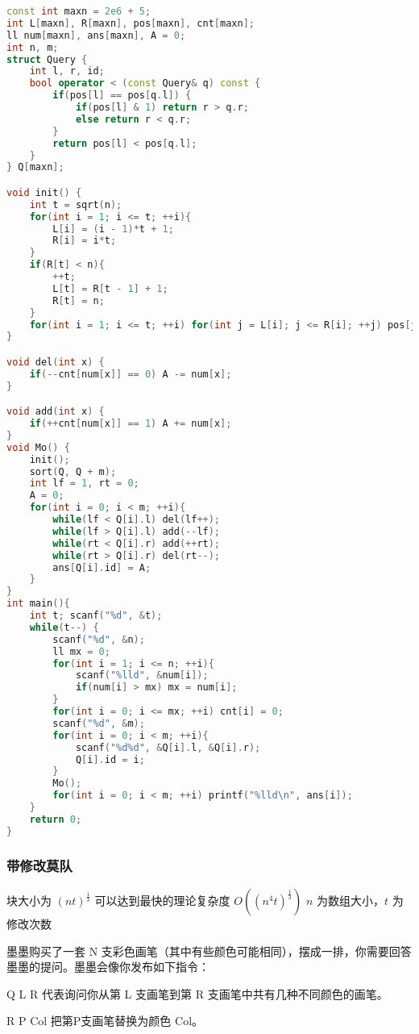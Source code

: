 \begin{lstlisting}[language=C++]
const int maxn = 2e6 + 5;
int L[maxn], R[maxn], pos[maxn], cnt[maxn];
ll num[maxn], ans[maxn], A = 0;
int n, m;
struct Query {
    int l, r, id;
    bool operator < (const Query& q) const {
        if(pos[l] == pos[q.l]) {
            if(pos[l] & 1) return r > q.r;
            else return r < q.r;
        }
        return pos[l] < pos[q.l];
    }
} Q[maxn];

void init() {
    int t = sqrt(n);
    for(int i = 1; i <= t; ++i){
        L[i] = (i - 1)*t + 1;
        R[i] = i*t;
    }
    if(R[t] < n){
        ++t;
        L[t] = R[t - 1] + 1;
        R[t] = n;
    }
    for(int i = 1; i <= t; ++i) for(int j = L[i]; j <= R[i]; ++j) pos[j] = i;
}

void del(int x) {
    if(--cnt[num[x]] == 0) A -= num[x];
}

void add(int x) {
    if(++cnt[num[x]] == 1) A += num[x];
}
void Mo() {
    init();
    sort(Q, Q + m);
    int lf = 1, rt = 0;
    A = 0;
    for(int i = 0; i < m; ++i){
        while(lf < Q[i].l) del(lf++);
        while(lf > Q[i].l) add(--lf);
        while(rt < Q[i].r) add(++rt);
        while(rt > Q[i].r) del(rt--);
        ans[Q[i].id] = A;
    }
}
int main(){
    int t; scanf("%d", &t);
    while(t--) {
        scanf("%d", &n);
        ll mx = 0;
        for(int i = 1; i <= n; ++i){
            scanf("%lld", &num[i]);
            if(num[i] > mx) mx = num[i];
        }
        for(int i = 0; i <= mx; ++i) cnt[i] = 0;
        scanf("%d", &m);
        for(int i = 0; i < m; ++i){
            scanf("%d%d", &Q[i].l, &Q[i].r);
            Q[i].id = i;
        }
        Mo();
        for(int i = 0; i < m; ++i) printf("%lld\n", ans[i]);
    }
    return 0;
}
\end{lstlisting}

\subsubsection{带修改莫队}

块大小为 $(nt) ^ \frac{1}{3}$ 可以达到最快的理论复杂度 $O((n ^ 4 t) ^ \frac{1}{3})$ $n$ 为数组大小，$t$ 为修改次数


墨墨购买了一套 N 支彩色画笔（其中有些颜色可能相同），摆成一排，你需要回答墨墨的提问。墨墨会像你发布如下指令：

Q L R 代表询问你从第 L 支画笔到第 R 支画笔中共有几种不同颜色的画笔。 

R P Col 把第P支画笔替换为颜色 Col。

